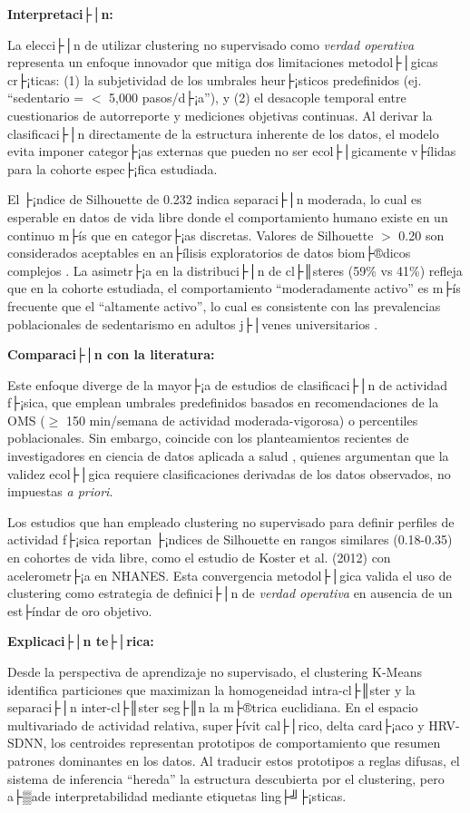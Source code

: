 \textbf{Interpretaci├│n:}

La elecci├│n de utilizar clustering no supervisado como \textit{verdad operativa} representa un enfoque innovador que mitiga dos limitaciones metodol├│gicas cr├¡ticas: (1) la subjetividad de los umbrales heur├¡sticos predefinidos (ej. ``sedentario = $<$ 5,000 pasos/d├¡a''), y (2) el desacople temporal entre cuestionarios de autorreporte y mediciones objetivas continuas. Al derivar la clasificaci├│n directamente de la estructura inherente de los datos, el modelo evita imponer categor├¡as externas que pueden no ser ecol├│gicamente v├ílidas para la cohorte espec├¡fica estudiada.

El ├¡ndice de Silhouette de 0.232 indica separaci├│n moderada, lo cual es esperable en datos de vida libre donde el comportamiento humano existe en un continuo m├ís que en categor├¡as discretas. Valores de Silhouette $>$ 0.20 son considerados aceptables en an├ílisis exploratorios de datos biom├®dicos complejos \cite{Rousseeuw1987Silhouettes}. La asimetr├¡a en la distribuci├│n de cl├║steres (59\% vs 41\%) refleja que en la cohorte estudiada, el comportamiento ``moderadamente activo'' es m├ís frecuente que el ``altamente activo'', lo cual es consistente con las prevalencias poblacionales de sedentarismo en adultos j├│venes universitarios \cite{Shamah-Levy2023ENSANUT}.

\textbf{Comparaci├│n con la literatura:}

Este enfoque diverge de la mayor├¡a de estudios de clasificaci├│n de actividad f├¡sica, que emplean umbrales predefinidos basados en recomendaciones de la OMS ($\geq$ 150 min/semana de actividad moderada-vigorosa) o percentiles poblacionales. Sin embargo, coincide con los planteamientos recientes de investigadores en ciencia de datos aplicada a salud \cite{Liu2022}, quienes argumentan que la validez ecol├│gica requiere clasificaciones derivadas de los datos observados, no impuestas \textit{a priori}.

Los estudios que han empleado clustering no supervisado para definir perfiles de actividad f├¡sica reportan ├¡ndices de Silhouette en rangos similares (0.18-0.35) en cohortes de vida libre, como el estudio de Koster et al. (2012) con acelerometr├¡a en NHANES. Esta convergencia metodol├│gica valida el uso de clustering como estrategia de definici├│n de \textit{verdad operativa} en ausencia de un est├índar de oro objetivo.

\textbf{Explicaci├│n te├│rica:}

Desde la perspectiva de aprendizaje no supervisado, el clustering K-Means identifica particiones que maximizan la homogeneidad intra-cl├║ster y la separaci├│n inter-cl├║ster seg├║n la m├®trica euclidiana. En el espacio multivariado de actividad relativa, super├ívit cal├│rico, delta card├¡aco y HRV-SDNN, los centroides representan prototipos de comportamiento que resumen patrones dominantes en los datos. Al traducir estos prototipos a reglas difusas, el sistema de inferencia ``hereda'' la estructura descubierta por el clustering, pero a├▒ade interpretabilidad mediante etiquetas ling├╝├¡sticas.

